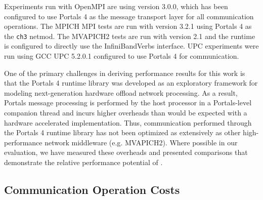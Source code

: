 
Experiments run with OpenMPI are using version 3.0.0, which has been configured
to use Portals 4 as the message transport layer for all communication
operations. The MPICH MPI tests are run with version 3.2.1 using Portals 4 as
the {\tt ch3} netmod. The MVAPICH2 tests are run with version 2.1 and the
runtime is configured to directly use the InfiniBand\othertm Verbs interface.
UPC experiments were run using GCC UPC 5.2.0.1 configured to use Portals 4 for
communication.

One of the primary challenges in deriving performance results for this work is
that the Portals 4 runtime library was developed as an exploratory framework
for modeling next-generation hardware offload network processing. As a result,
Portals message processing is performed by the host processor in a Portals-level companion thread and
incurs higher overheads than would be expected with a hardware accelerated
implementation. Thus, communication performed through the Portals 4 runtime
library has not been optimized as extensively as other high-performance network
middleware (e.g. MVAPICH2). Where possible in our evaluation, we have measured
these overheads and presented comparisons that demonstrate the relative
performance potential of \pdht.






\subsection{Communication Operation Costs}

